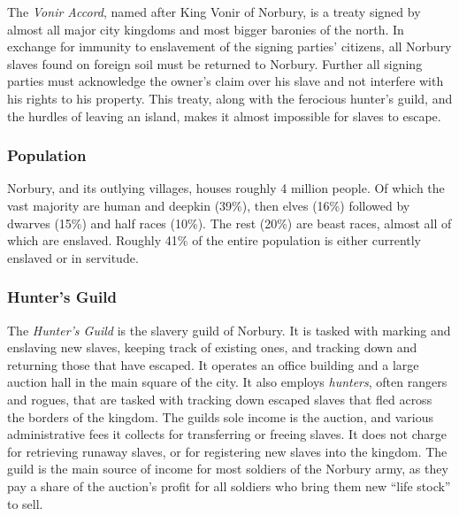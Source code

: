 The \emph{Vonir Accord}, named after King Vonir of Norbury, is a treaty signed
by almost all major city kingdoms and most bigger baronies of the north. In
exchange for immunity to enslavement of the signing parties' citizens, all
Norbury slaves found on foreign soil must be returned to Norbury. Further all
signing parties must acknowledge the owner's claim over his slave and not
interfere with his rights to his property. This treaty, along with the
ferocious hunter's guild, and the hurdles of leaving an island, makes it almost
impossible for slaves to escape.

\subsubsection*{Population}

Norbury, and its outlying villages, houses roughly 4 million people. Of which
the vast majority are human and deepkin (39\%), then elves (16\%) followed by
dwarves (15\%) and half races (10\%). The rest (20\%) are beast races, almost
all of which are enslaved. Roughly 41\% of the entire population is either
currently enslaved or in servitude.

\subsubsection*{Hunter's Guild}

The \emph{Hunter's Guild} is the slavery guild of Norbury. It is tasked with
marking and enslaving new slaves, keeping track of existing ones, and tracking
down and returning those that have escaped. It operates an office building and
a large auction hall in the main square of the city. It also employs
\emph{hunters}, often rangers and rogues, that are tasked with tracking down
escaped slaves that fled across the borders of the kingdom. The guilds sole
income is the auction, and various administrative fees it collects for
transferring or freeing slaves. It does not charge for retrieving runaway
slaves, or for registering new slaves into the kingdom. The guild is the main
source of income for most soldiers of the Norbury army, as they pay a share of
the auction's profit for all soldiers who bring them new ``life stock'' to
sell.

